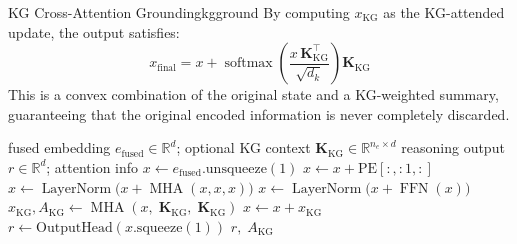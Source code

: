 \documentclass[12pt,a4paper]{article}
\newcommand{\MHA}{\operatorname{MHA}}
\newcommand{\LN}{\operatorname{LayerNorm}}
\newcommand{\FFN}{\operatorname{FFN}}
\newcommand{\softmax}{\operatorname{softmax}}
\newcommand{\efused}{e_{\text{fused}}}
\newcommand{\R}{\mathbb{R}}
\begin{document}
\begin{theorem}{KG Cross-Attention Grounding}{kgground}
By computing $x_{\text{KG}}$ as the KG-attended update, the output satisfies:
\[
  x_{\text{final}} = x + \softmax\!\left(\frac{x\,\mathbf{K}_{\text{KG}}^\top}
  {\sqrt{d_k}}\right)\mathbf{K}_{\text{KG}}
\]
This is a convex combination of the original state and a KG-weighted summary,
guaranteeing that the original encoded information is never completely discarded.
\end{theorem}

\begin{algorithm}[H]
\caption{Transformer Reasoning Module Forward Pass}
\label{alg:reason}
\begin{algorithmic}[1]
\Require fused embedding $\efused \in \R^{d}$; optional KG context $\mathbf{K}_\text{KG} \in \R^{n_e \times d}$
\Ensure reasoning output $r \in \R^d$; attention info
\State $x \leftarrow \efused.\text{unsqueeze}(1)$  
\State $x \leftarrow x + \text{PE}[:,\!:\!1,\!:]$  
  \State $x \leftarrow \LN\!\bigl(x + \MHA(x, x, x)\bigr)$  
  \State $x \leftarrow \LN\!\bigl(x + \FFN(x)\bigr)$  
\EndFor
{}
  \State $x_\text{KG}, A_\text{KG} \leftarrow \MHA(x,\;\mathbf{K}_\text{KG},\;\mathbf{K}_\text{KG})$
  \State $x \leftarrow x + x_\text{KG}$  
\EndIf
\State $r \leftarrow \text{OutputHead}(x.\text{squeeze}(1))$  
\State \Return $r,\; A_\text{KG}$
\end{algorithmic}
\end{algorithm}
\end{document}
